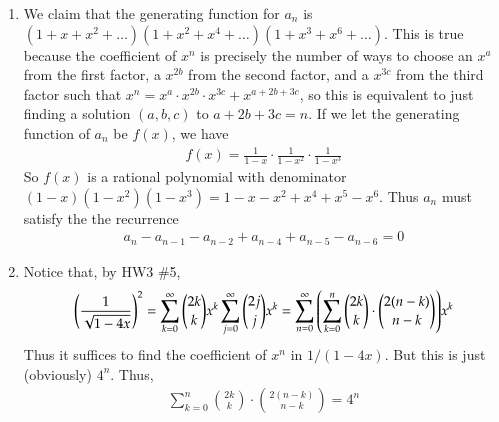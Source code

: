 \documentclass[12pt]{article}
\theoremstyle{definitionstyle}
\begin{document}
\begin{enumerate}[leftmargin=\labelsep]
	
		\item We claim that the generating function for $a_n$ is $(1+x+x^2+\ldots)(1+x^2+x^4+\ldots)(1+x^3+x^6+\ldots)$. This is true because the coefficient of $x^n$ is precisely the number of ways to choose an $x^a$ from the first factor, a $x^{2b}$ from the second factor, and a $x^{3c}$ from the third factor such that $x^n = x^a \cdot x^{2b} \cdot x^{3c} + x^{a + 2b + 3c}$, so this is equivalent to just finding a solution $(a, b, c)$ to $a + 2b + 3c = n$. If we let the generating function of $a_n$ be $f(x)$, we have
		\begin{align*}
			f(x) = \frac{1}{1-x} \cdot \frac{1}{1-x^2} \cdot \frac{1}{1-x^3}
		\end{align*}
		So $f(x)$ is a rational polynomial with denominator $(1-x)(1-x^2)(1-x^3) = 1-x-x^2+x^4+x^5-x^6$. Thus $a_n$ must satisfy the the recurrence
		\begin{align*}
			a_n - a_{n-1} - a_{n-2} + a_{n-4} + a_{n-5} - a_{n-6} = 0
		\end{align*}
	
		\item  Notice that, by HW3 \#5, 
		\begin{align*}
			\qty(\frac{1}{\sqrt{1-4x}})^2 = \sum_{k=0}^\infty {2k \choose k} x^k \sum_{j=0}^\infty {2j \choose j} x^k = \sum_{n=0}^\infty \qty(\sum_{k=0}^n {2k \choose k} \cdot {2(n-k) \choose n-k}) x^k
		\end{align*}
		Thus it suffices to find the coefficient of $x^n$ in $1/(1-4x)$. But this is just (obviously) $4^n$. Thus,
		\begin{align*}
			\sum_{k=0}^n {2k \choose k} \cdot {2(n-k) \choose n-k} = 4^n
		\end{align*}
	\end{enumerate}
\end{document}
